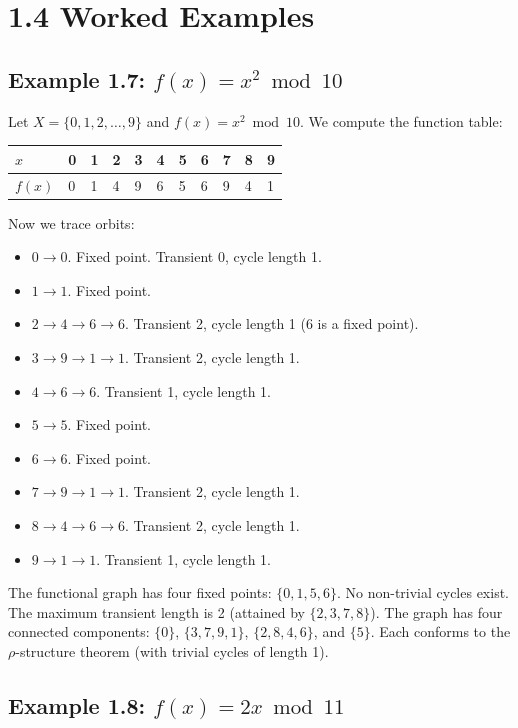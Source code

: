 \section{1.4 Worked Examples}

\subsection{Example 1.7: $f(x) = x^2 \bmod 10$}

Let $X = \{ 0, 1, 2, \ldots, 9\} $ and $f(x) = x^2 \bmod 10$. We compute the function table:

\begin{tabular}{|l|l|l|l|l|l|l|l|l|l|l|}
\hline
$x$ & 0 & 1 & 2 & 3 & 4 & 5 & 6 & 7 & 8 & 9 \\
\hline
$f(x)$ & 0 & 1 & 4 & 9 & 6 & 5 & 6 & 9 & 4 & 1 \\
\hline
\end{tabular}


Now we trace orbits:
\begin{itemize}
  \item $0 \to 0$. Fixed point. Transient 0, cycle length 1.
  \item $1 \to 1$. Fixed point.
  \item $2 \to 4 \to 6 \to 6$. Transient 2, cycle length 1 (6 is a fixed point).
  \item $3 \to 9 \to 1 \to 1$. Transient 2, cycle length 1.
  \item $4 \to 6 \to 6$. Transient 1, cycle length 1.
  \item $5 \to 5$. Fixed point.
  \item $6 \to 6$. Fixed point.
  \item $7 \to 9 \to 1 \to 1$. Transient 2, cycle length 1.
  \item $8 \to 4 \to 6 \to 6$. Transient 2, cycle length 1.
  \item $9 \to 1 \to 1$. Transient 1, cycle length 1.
\end{itemize}

The functional graph has four fixed points: $\{ 0, 1, 5, 6\} $. No non-trivial cycles exist. The maximum transient length is 2 (attained by $\{ 2, 3, 7, 8\} $). The graph has four connected components: $\{ 0\} $, $\{ 3, 7, 9, 1\} $, $\{ 2, 8, 4, 6\} $, and $\{ 5\} $. Each conforms to the $\rho$-structure theorem (with trivial cycles of length 1).

\subsection{Example 1.8: $f(x) = 2x \bmod 11$}

